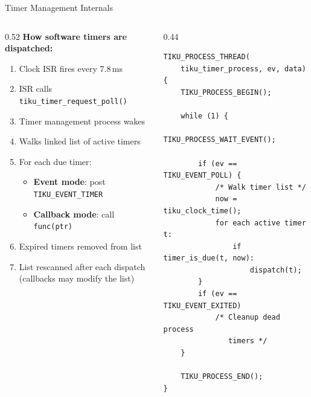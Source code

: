 \documentclass[aspectratio=169, 10pt]{beamer}
\begin{document}
\begin{frame}[fragile]{Timer Management Internals}
\begin{columns}[T]
\begin{column}{0.52\textwidth}
\textbf{How software timers are dispatched:}
\begin{enumerate}
  \item Clock ISR fires every 7.8\,ms
  \item ISR calls \texttt{tiku\_timer\_request\_poll()}
  \item Timer management process wakes
  \item Walks linked list of active timers
  \item For each due timer:
    \begin{itemize}
      \item \textbf{Event mode}: post \texttt{TIKU\_EVENT\_TIMER}
      \item \textbf{Callback mode}: call \texttt{func(ptr)}
    \end{itemize}
  \item Expired timers removed from list
  \item List rescanned after each dispatch\\
        (callbacks may modify the list)
\end{enumerate}
\end{column}

\begin{column}{0.44\textwidth}
\begin{lstlisting}[style=cstyle, basicstyle=\ttfamily\tiny,
  title={Timer process (simplified)}]
TIKU_PROCESS_THREAD(
    tiku_timer_process, ev, data)
{
    TIKU_PROCESS_BEGIN();

    while (1) {
        TIKU_PROCESS_WAIT_EVENT();

        if (ev == TIKU_EVENT_POLL) {
            /* Walk timer list */
            now = tiku_clock_time();
            for each active timer t:
                if timer_is_due(t, now):
                    dispatch(t);
        }
        if (ev == TIKU_EVENT_EXITED)
            /* Cleanup dead process
               timers */
    }

    TIKU_PROCESS_END();
}
\end{lstlisting}
\end{column}
\end{columns}
\end{frame}
\end{document}
